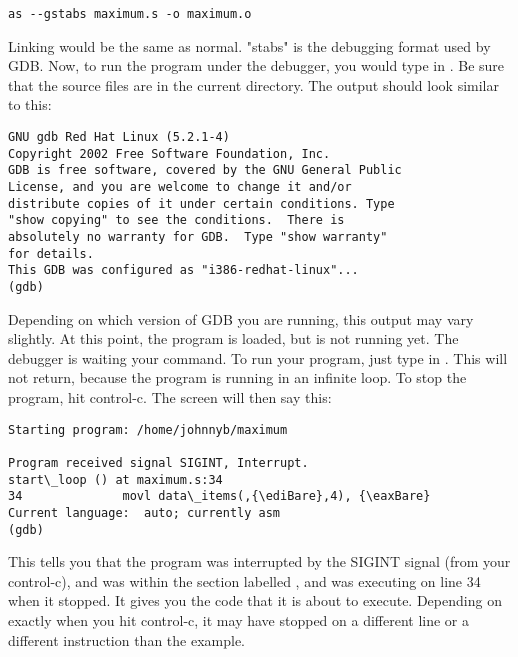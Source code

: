 \begin{simpletyping}
\begin{lstlisting}
as --gstabs maximum.s -o maximum.o
\end{lstlisting}
\end{simpletyping}

Linking would be the same as normal.  "stabs" is the debugging format used
by GDB.  Now, to run the program under the debugger, you would type in
.  Be sure that the source files are in
the current directory.  The output should look similar to this:

\begin{simpletyping}
\begin{lstlisting}
GNU gdb Red Hat Linux (5.2.1-4)
Copyright 2002 Free Software Foundation, Inc.
GDB is free software, covered by the GNU General Public 
License, and you are welcome to change it and/or 
distribute copies of it under certain conditions. Type 
"show copying" to see the conditions.  There is 
absolutely no warranty for GDB.  Type "show warranty" 
for details.  
This GDB was configured as "i386-redhat-linux"...
(gdb)
\end{lstlisting}
\end{simpletyping}

Depending on which version of GDB you are running, this output may vary
slightly.  At this point, the program is loaded, but is not running yet.
The debugger is waiting your command.  To run your program, just type in
.  This will not return, because the program
is running in an infinite loop.  To stop the program, hit control-c.
The screen will then say this:

\begin{simpletyping}
\begin{lstlisting}
Starting program: /home/johnnyb/maximum

Program received signal SIGINT, Interrupt.
start\_loop () at maximum.s:34
34              movl data\_items(,{\ediBare},4), {\eaxBare}
Current language:  auto; currently asm
(gdb)
\end{lstlisting}
\end{simpletyping}

This tells you that the program was interrupted by the SIGINT signal (from your
control-c), and was within the section labelled ,
and was executing on line 34 when it stopped.  It gives you the code that
it is about to execute.  Depending on exactly when you hit control-c, it may
have stopped on a different line or a different instruction than the example.

